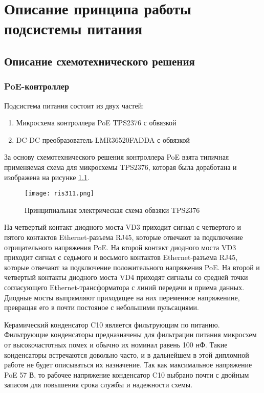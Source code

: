 \chapter{Описание принципа работы подсистемы питания}
\section{Описание схемотехнического решения}
\subsection{PoE-контроллер}
\hspace{1cm} 
Подсистема питания состоит из двух частей:

\begin{enumerate}
    \item Микросхема контроллера PoE TPS2376 с обвязкой
    \item DC-DC преобразователь LMR36520FADDA с обвязкой 
\end{enumerate}

За основу схемотехнического решения контроллера PoE взята типичная применяемая схема для
микросхемы TPS2376, которая была доработана и изображена на рисунке \ref{ris:311}.

\begin{figure}[H]
    \centering
    \texttt{[image: ris311.png]}
    \caption{Принципиальная электрическая схема обвзяки TPS2376 }
    \label{ris:311}
\end{figure}

На четвертый контакт диодного моста VD3 приходит сигнал с четвертого и пятого контактов 
Ethernet-разъема RJ45, которые отвечают за подключение отрицательного напряжения PoE.
На второй контакт диодного моста VD3 приходит сигнал с седьмого и восьмого контактов 
Ethernet-разъема RJ45, которые отвечают за подключение положительного напряжения PoE.  
На второй и четвертый контакты диодного моста VD4 приходят сигналы со средней точки согласующего
Ethernet-трансформатора с линий передачи и приема данных. Диодные мосты выпрямляют приходящее
на них переменное напряженине, превращая его в почти постояное с небольшими пульсациями.

Керамический конденсатор C10 является фильтрующим по питанию. Фильтрующие конденсаторы предназначены 
для фильтрации питания микросхем от высокочастотных помех и обычно их номинал равень 100 нФ.
Такие конденсаторы встречаются довольно  часто, и в дальнейшем в этой дипломной работе не будет 
описываться их назначение. Так как максимальное напряжение PoE 57 В, то рабочее напряжение 
конденсатор C10 выбрано почти с двойным запасом для повышения срока службы и надежности схемы.

